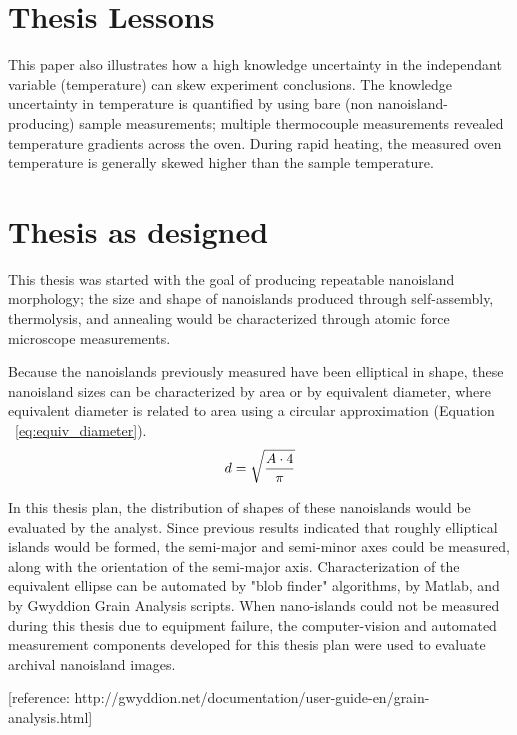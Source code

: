 


\section{Thesis Lessons}

This paper also illustrates how a high knowledge uncertainty in the independant variable (temperature) can skew experiment conclusions.  
The knowledge uncertainty in temperature is quantified by using bare (non nanoisland-producing) sample measurements; 
    multiple thermocouple measurements revealed temperature gradients across the oven.
During rapid heating, the measured oven temperature is generally skewed higher than the sample temperature.

\section{Thesis as designed}

This thesis was started with the goal of producing repeatable nanoisland morphology; 
the size and shape of nanoislands produced through self-assembly, thermolysis, and annealing would be characterized through atomic force microscope measurements.

Because the nanoislands previously measured have been elliptical in shape, these nanoisland sizes can be characterized by area or by equivalent diameter, 
where equivalent diameter is related to area using a circular approximation (Equation ~\ref{eq:equiv_diameter}).
\begin{equation}
    d = \sqrt{ A \cdot 4 \over{\pi} }
\label{eq:equiv_diameter}
\end{equation}

In this thesis plan, the distribution of shapes of these nanoislands would be evaluated by the analyst.
Since previous results indicated that roughly elliptical islands would be formed, the semi-major and semi-minor axes could be measured, along with the orientation of the semi-major axis.  
Characterization of the equivalent ellipse can be automated by "blob finder" algorithms, by Matlab, and by Gwyddion Grain Analysis scripts.  
When nano-islands could not be measured during this thesis due to equipment failure, the computer-vision and automated measurement components developed for this thesis plan were used to evaluate archival nanoisland images.

[reference: http://gwyddion.net/documentation/user-guide-en/grain-analysis.html]

